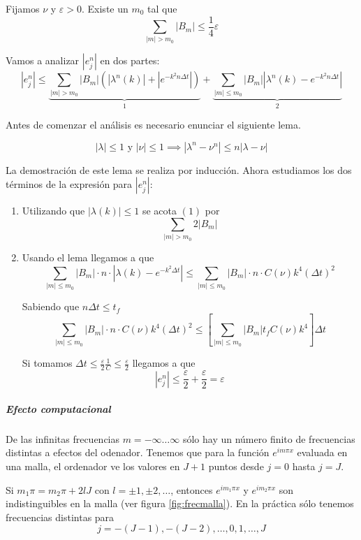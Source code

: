 Fijamos $\nu$ y $\varepsilon > 0$. Existe un $m_0$ tal que $$\sum_{|m|>m_0} |B_m|\le \frac{1}{4}\varepsilon$$

Vamos a analizar $|e_j^n|$ en dos partes:
\begin{equation*}
	|e_j^n| \le \underbrace{\sum_{|m|>m_0}|B_m|\left(|\lambda^n(k)|+\left|e^{-k^2n\Delta t}\right|\right)}_1 + \underbrace{\sum_{|m|\le m_0}|B_m|\left|\lambda^n(k)-e^{-k^2n\Delta t}\right|}_2
\end{equation*}

Antes de comenzar el análisis es necesario enunciar el siguiente lema.
\begin{lemma}
	$$|\lambda| \le 1\text{ y }|\nu|\le 1 \implies |\lambda^n-\nu^n|\le n|\lambda-\nu|$$
\end{lemma}

La demostración de este lema se realiza por inducción. Ahora estudiamos los dos términos de la expresión para $|e_j^n|$:

\begin{enumerate}
	\item Utilizando que $|\lambda(k)| \le 1$ se acota $(1)$ por $$\sum_{|m|>m_0}2|B_m|$$
	\item Usando el lema llegamos a que
	$$\sum_{|m|\le m_0}{|B_m|\cdot n\cdot \left|\lambda(k)-e^{-k^2\Delta t}\right|} \le \sum_{|m|\le m_0}{|B_m|\cdot n \cdot C(\nu)k^4(\Delta t)^2}$$
	
	Sabiendo que $n\Delta t\le t_f$
	$$\sum_{|m|\le m_0}{|B_m|\cdot n \cdot C(\nu)k^4(\Delta t)^2} \le \left[\sum_{|m|\le m_0}|B_m|t_fC(\nu)k^4\right]\Delta t$$
	
	Si tomamos $\Delta t\le \frac{\varepsilon}{2}\frac{1}{C}\le\frac{\varepsilon}{2}$ llegamos a que
	$$|e_j^n| \le \frac{\varepsilon}{2} + \frac{\varepsilon}{2} = \varepsilon$$
\end{enumerate}

\subparagraph{Efecto computacional}\mbox{}

De las infinitas frecuencias $m=-\infty\hdots\infty$ sólo hay un número finito de frecuencias distintas a efectos del odenador. Tenemos que para la función $e^{im\pi x}$ evaluada en una malla, el ordenador ve los valores en $J+1$ puntos desde $j=0$ hasta $j = J$. 

Si $m_1\pi = m_2\pi + 2lJ$ con $l=\pm1,\pm2,\hdots$, entonces $e^{im_1\pi x}$ y $e^{im_2\pi x}$ son indistinguibles en la malla (ver figura \ref{fig:frecmalla}).
En la práctica sólo tenemos frecuencias distintas para $$j=-(J-1), -(J-2), \hdots, 0, 1, \hdots, J$$

